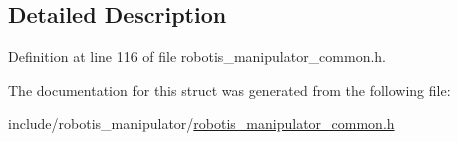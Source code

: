 \subsection{Detailed Description}


Definition at line 116 of file robotis\+\_\+manipulator\+\_\+common.\+h.



The documentation for this struct was generated from the following file\+:\begin{DoxyCompactItemize}
\item 
include/robotis\+\_\+manipulator/\hyperlink{robotis__manipulator__common_8h}{robotis\+\_\+manipulator\+\_\+common.\+h}\end{DoxyCompactItemize}
